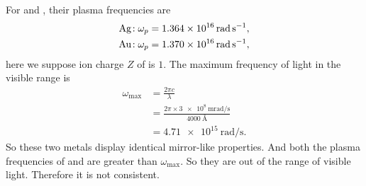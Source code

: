 \documentclass[12pt]{article}
\begin{document}
For  and , their plasma frequencies are
\begin{align}
	\ce{Ag}\!: \omega_p & = \SI{1.364e16}{\radian\per\second} , \\
	\ce{Au}\!: \omega_p & = \SI{1.370e16}{\radian\per\second},
\end{align}
here we suppose ion charge $Z$ of  is $1$.
The maximum frequency of light in the visible range is
\begin{equation}
	\begin{split}
		\omega_\text{max} &= \frac{2\pi c}{\lambda}\\
		&= \frac{2\pi \times \SI{3e8}{\meter \radian\per\second}}{\SI{4000}{\angstrom}} \\
		&=  \SI{4.71e15}{\radian\per\second}.
	\end{split}
\end{equation}
So these two metals display identical mirror-like properties.
And both the plasma frequencies of  and  are greater than $\omega_\text{max}$.
So they are out of the range of visible light. Therefore it is not consistent.
\end{document}

